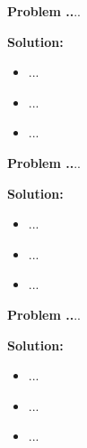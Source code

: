 \documentclass{article}
\theoremstyle{problemstyle}
\newenvironment{boxedproblem}[1]
{\begin{tcolorbox}[colback=white, colframe=black, boxrule=0.5pt]\noindent\textbf{Problem #1.}}
{\end{tcolorbox}}
\begin{document}
    
    \begin{boxedproblem}{48}
    ...
    \end{boxedproblem}
    
    \textbf{Solution:}
    \begin{itemize}[label={},leftmargin=1.25cm,nosep]
        \item ...
        \item ...
        \item ...
    \end{itemize}
    
    
    \begin{boxedproblem}{49}
    ...
    \end{boxedproblem}
    
    \textbf{Solution:}
    \begin{itemize}[label={},leftmargin=1.25cm,nosep]
        \item ...
        \item ...
        \item ...
    \end{itemize}
    
    
    \begin{boxedproblem}{50}
    ...
    \end{boxedproblem}
    
    \textbf{Solution:}
    \begin{itemize}[label={},leftmargin=1.25cm,nosep]
        \item ...
        \item ...
        \item ...
    \end{itemize}
    
\end{document}
